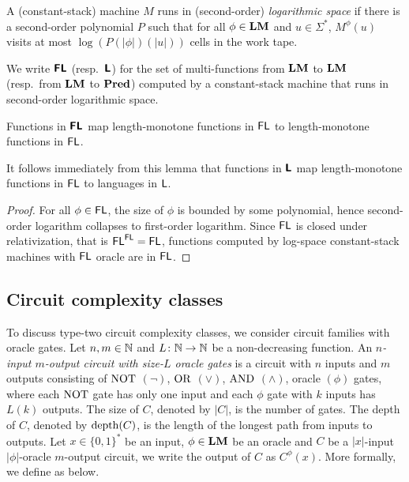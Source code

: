 \documentclass[envcountsame,orivec,oribibl]{llncs}
\begin{document}
\begin{definition}
 A (constant-stack) machine $M$ runs in (second-order) \emph{logarithmic space}
 if there is a second-order polynomial $P$ such that for all $\phi \in \mathbf{LM}$
 and $u \in \Sigma^*$, $M^\phi(u)$ visits at most $\log(P(|\phi|)(|u|))$ cells
 in the work tape.
\end{definition}

\begin{definition}
 We write $\text{\bfseries \sffamily \upshape FL}$ (resp.\ $\text{\bfseries \sffamily \upshape L}$) for the set of multi-functions 
 from $\mathbf{LM}$ to $\mathbf{LM}$ (resp.\ from $\mathbf{LM}$ to $\mathbf{Pred}$)
 computed by a constant-stack machine that runs in second-order logarithmic space.
\end{definition}

\begin{lemma}
\label{lemma:Ltwo-maps-L-to-L}
 Functions in $\text{\bfseries \sffamily \upshape FL}$ map 
 length-monotone functions in $\mathsf{FL}$
 to length-monotone functions in $\mathsf{FL}$.
\end{lemma}

It follows immediately from this lemma that functions in $\text{\bfseries \sffamily \upshape L}$ map
length-monotone functions in $\mathsf{FL}$ to languages in $\mathsf{L}$.

\begin{proof}
For all $\phi \in \mathsf{FL}$, the size of $\phi$ is bounded by some polynomial,
hence second-order logarithm collapses to first-order logarithm.
Since $\mathsf{FL}$ is closed under relativization, that is $\mathsf{FL}^{\mathsf{FL}} = \mathsf{FL}$,
functions computed by log-space constant-stack machines with $\mathsf{FL}$ oracle are in $\mathsf{FL}$.
\end{proof}


\subsection{Circuit complexity classes}

To discuss type-two circuit complexity classes,
we consider circuit families with oracle gates.
Let $n, m \in \mathbb N$ and $L \colon \mathbb N \to \mathbb N$ be a non-decreasing function.
An \emph{$n$-input $m$-output circuit with size-$L$ oracle gates} is a circuit with
$n$ inputs and $m$ outputs consisting of 
$\mathrm{NOT}$ $(\neg)$, $\mathrm{OR}$ $(\vee)$, $\mathrm{AND}$ $(\wedge)$, oracle $(\phi)$ gates,
where each $\mathrm{NOT}$ gate has only one input and each $\phi$ gate with $k$ inputs
has $L(k)$ outputs.
The size of $C$, denoted by $|C|$, is the number of gates.
The depth of $C$, denoted by $\mathop{\rm depth}(C)$, is the length of the longest path
from inputs to outputs.
Let $x \in \{0, 1\}^*$ be an input, $\phi \in \mathbf{LM}$ be an oracle and
$C$ be a $|x|$-input $|\phi|$-oracle $m$-output circuit,
we write the output of $C$ as $C^\phi(x)$.
More formally, we define as below.
\end{document}
